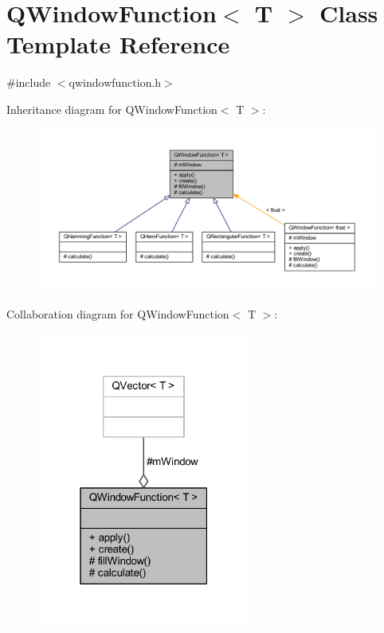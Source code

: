 \hypertarget{a00071}{\section{Q\+Window\+Function$<$ T $>$ Class Template Reference}
\label{a00071}
}


{\ttfamily \#include $<$qwindowfunction.\+h$>$}



Inheritance diagram for Q\+Window\+Function$<$ T $>$\+:
\nopagebreak
\begin{figure}[H]
\begin{center}
\leavevmode
\includegraphics[width=350pt]{de/de7/a00550}
\end{center}
\end{figure}


Collaboration diagram for Q\+Window\+Function$<$ T $>$\+:
\nopagebreak
\begin{figure}[H]
\begin{center}
\leavevmode
\includegraphics[width=199pt]{d9/d87/a00551}
\end{center}
\end{figure}
